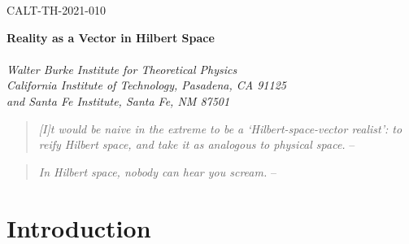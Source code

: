 \documentclass[12pt,english]{article}
\begin{document}
\hfill CALT-TH-2021-010
\hfill

\thispagestyle{empty}
\medskip

\begin{center}
{\large\bf
Reality as a Vector in Hilbert Space
}\\
 \\[7mm]
 {\it Walter Burke Institute for Theoretical Physics\\
    California Institute of Technology,
   Pasadena, CA 91125\\
   and Santa Fe Institute, Santa Fe, NM 87501} \\
\end{center}

\begin{abstract}
I defend the extremist position that the fundamental ontology of the world consists of a vector in Hilbert space evolving according to the Schr\"odinger equation.
The laws of physics are determined solely by the energy eigenspectrum of the Hamiltonian.
The structure of our observed world, including space and fields living within it, should arise as a higher-level emergent description.
I sketch how this might come about, although much work remains to be done.

Invited contribution to the volume \emph{Quantum Mechanics and Fundamentality: Naturalizing Quantum Theory Between Scientific Realism and Ontological Indeterminacy}; Valia Allori (ed.).
\end{abstract}



\newpage
	
\setcounter{footnote}{0}

\begin{quote}
\emph{[I]t would be naive in the extreme to be a `Hilbert-space-vector realist': to reify Hilbert space, and take it as analogous to physical space.} 
-- \citet{wallace2017}
\end{quote}

\begin{quote}
\emph{In Hilbert space, nobody can hear you scream.} -- \citet{aharonov2005quantum}
\end{quote}


\section{Introduction}
\end{document}
